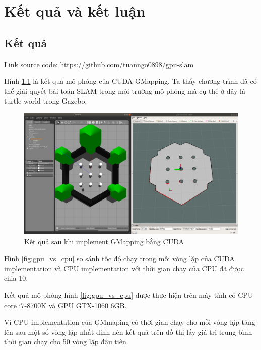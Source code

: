 \documentclass[../../main.tex]{subfiles}
\begin{document}
\graphicspath{{img/}{06_result/img/}}

\chapter{Kết quả và kết luận}

\section{Kết quả}
Link source code: https://github.com/tuanngo0898/gpu-slam

Hình \ref{fig:cuda_implement_result} là kết quả mô phỏng của CUDA-GMapping. Ta thấy chương trình đã có thể giải quyết bài toán SLAM trong môi trường mô phỏng mà cụ thể ở đây là turtle-world trong Gazebo.
\begin{figure}[H]
    \begin{center}
        \includegraphics[scale=0.25]{turtle_world.png}
    \end{center}
    \caption{Kết quả sau khi implement GMapping bằng CUDA}
    \label{fig:cuda_implement_result}
\end{figure}

Hình \ref{fig:gpu_vs_cpu} so sánh tốc độ chạy trong mỗi vòng lặp của CUDA implementation và CPU implementation với thời gian chạy của CPU đã được chia 10.

Kết quả mô phỏng hình \ref{fig:gpu_vs_cpu} được thực hiện trên máy tính có CPU core i7-8700K và GPU GTX-1060 6GB.

Vì CPU implementation của GMmaping có thời gian chạy cho mỗi vòng lặp tăng lên sau một số vòng lặp nhất định nên kết quả trên đồ thị lấy giá trị trung bình thời gian chạy cho 50 vòng lặp đầu tiên.
\end{document}
